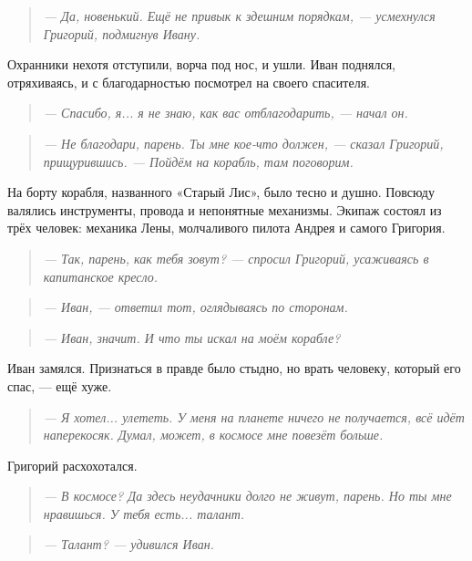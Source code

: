 \documentclass[12pt,a4paper]{book}
\newenvironment{dialogue}{\begin{quote}\itshape}{\end{quote}}
\begin{document}
\begin{dialogue}
--- Да, новенький. Ещё не привык к здешним порядкам, --- усмехнулся Григорий, подмигнув Ивану.
\end{dialogue}

Охранники нехотя отступили, ворча под нос, и ушли. Иван поднялся, отряхиваясь, и с благодарностью посмотрел на своего спасителя.

\begin{dialogue}
--- Спасибо, я... я не знаю, как вас отблагодарить, --- начал он.
\end{dialogue}

\begin{dialogue}
--- Не благодари, парень. Ты мне кое-что должен, --- сказал Григорий, прищурившись. --- Пойдём на корабль, там поговорим.
\end{dialogue}

На борту корабля, названного «Старый Лис», было тесно и душно. Повсюду валялись инструменты, провода и непонятные механизмы. Экипаж состоял из трёх человек: механика Лены, молчаливого пилота Андрея и самого Григория.

\begin{dialogue}
--- Так, парень, как тебя зовут? --- спросил Григорий, усаживаясь в капитанское кресло.
\end{dialogue}

\begin{dialogue}
--- Иван, --- ответил тот, оглядываясь по сторонам.
\end{dialogue}

\begin{dialogue}
--- Иван, значит. И что ты искал на моём корабле?
\end{dialogue}

Иван замялся. Признаться в правде было стыдно, но врать человеку, который его спас, --- ещё хуже.

\begin{dialogue}
--- Я хотел... улететь. У меня на планете ничего не получается, всё идёт наперекосяк. Думал, может, в космосе мне повезёт больше.
\end{dialogue}

Григорий расхохотался.

\begin{dialogue}
--- В космосе? Да здесь неудачники долго не живут, парень. Но ты мне нравишься. У тебя есть... талант.
\end{dialogue}

\begin{dialogue}
--- Талант? --- удивился Иван.
\end{dialogue}
\end{document}
